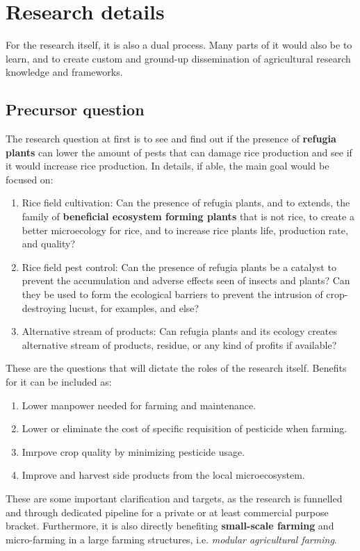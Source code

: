\documentclass[twocolumn,letterpaper, 12pt]{article}
\begin{document}
\section{Research details}

For the research itself, it is also a dual process. Many parts of it would also be to learn, and to create custom and ground-up dissemination of agricultural research knowledge and frameworks. 

\subsection{Precursor question}

The research question at first is to see and find out if the presence of \textbf{refugia plants} can lower the amount of pests that can damage rice production and see if it would increase rice production. In details, if able, the main goal would be focused on: 
\begin{enumerate}
    \item Rice field cultivation: Can the presence of refugia plants, and to extends, the family of \textbf{beneficial ecosystem forming plants} that is not rice, to create a better microecology for rice, and to increase rice plants life, production rate, and quality? 
    \item Rice field pest control: Can the presence of refugia plants be a catalyst to prevent the accumulation and adverse effects seen of insects and plants? Can they be used to form the ecological barriers to prevent the intrusion of crop-destroying lucust, for examples, and else? 
    \item Alternative stream of products: Can refugia plants and its ecology creates alternative stream of products, residue, or any kind of profits if available? 
\end{enumerate}
These are the questions that will dictate the roles of the research itself. Benefits for it can be included as: 
\begin{enumerate}
    \item Lower manpower needed for farming and maintenance. 
    \item Lower or eliminate the cost of specific requisition of pesticide when farming. 
    \item Imrpove crop quality by minimizing pesticide usage. 
    \item Improve and harvest side products from the local microecosystem. 
\end{enumerate}
These are some important clarification and targets, as the research is funnelled and through dedicated pipeline for a private or at least commercial purpose bracket. Furthermore, it is also directly benefiting \textbf{small-scale farming} and micro-farming in a large farming structures, i.e. \textit{modular agricultural farming}. 
\end{document}
